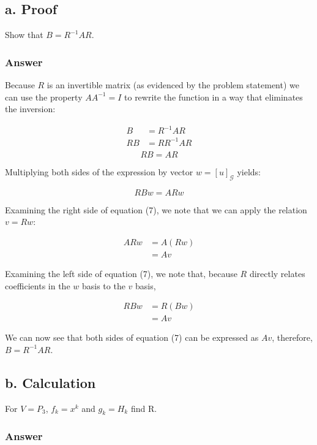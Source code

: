 \documentclass{article}
\begin{document}
		\subsection{a. Proof}
		Show that $B=R^{-1}AR$.
		
		\subsubsection{Answer}
		
		Because $R$ is an invertible matrix (as evidenced by the problem statement) we can use the property $AA^{-1}=I$ to rewrite the function in a way that eliminates the inversion:
		
		\begin{align*}
			B&=R^{-1}AR\\
			RB&=RR^{-1}AR\\
		\end{align*}
		\begin{equation}
		RB=AR
		\end{equation}
		
		Multiplying both sides of the expression by vector $w=[u]_{\mathcal{G}}$ yields:
		
		\begin{equation}
			RBw=ARw
		\end{equation}

		Examining the right side of equation (7), we note that we can apply the relation $v=Rw$:
		
		\begin{align*}
			ARw&=A(Rw) \\
			&=Av
		\end{align*}
		
		Examining the left side of equation (7), we note that, because $R$ directly relates coefficients in the $w$ basis to the $v$ basis,
		
		\begin{align*}
			RBw&=R(Bw)\\
			&=Av
		\end{align*}
		
		We can now see that both sides of equation (7) can be expressed as $Av$, therefore, $B=R^{-1}AR$.
		\subsection{b. Calculation}
		For $V=P_{3}$, $f_{k}=x^{k}$ and $g_{k}=H_{k}$ find R.
		
		\subsubsection{Answer}
		
\end{document}
